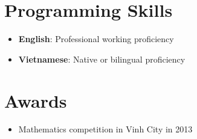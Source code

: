 \documentclass[letterpaper,11pt]{article}
\newcommand{\resumeItem}[2]{
  \item\small{
    \textbf{#1}{: #2 \vspace{-2pt}}
  }
}
\newcommand{\resumeSubItem}[2]{\resumeItem{#1}{#2}\vspace{-4pt}}
\newcommand{\resumeSubHeadingListStart}{\begin{itemize}[leftmargin=*]}
\newcommand{\resumeSubHeadingListEnd}{\end{itemize}}
\begin{document}
\section{Programming Skills}
 \resumeSubHeadingListStart
  \resumeSubItem{English}
  {Professional working proficiency}
  \resumeSubItem{Vietnamese}
  {Native or bilingual proficiency}
 \resumeSubHeadingListEnd

\section{Awards}
  \begin{itemize}[leftmargin=*]
    \item Mathematics competition in Vinh City in 2013
  \end{itemize}
\end{document}
